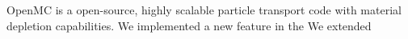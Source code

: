 OpenMC is a open-source, highly scalable particle transport code with material depletion capabilities. We implemented a new feature in the We extended 